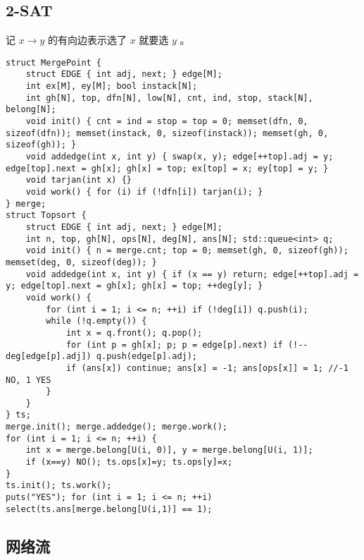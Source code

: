 \documentclass[landscape,a4paper]{article}
\begin{document}
\subsection{2-SAT}

记 $x \rightarrow y$ 的有向边表示选了 $x$ 就要选 $y$ 。

\begin{lstlisting}
struct MergePoint {
	struct EDGE { int adj, next; } edge[M];
	int ex[M], ey[M]; bool instack[N];
	int gh[N], top, dfn[N], low[N], cnt, ind, stop, stack[N], belong[N];
	void init() { cnt = ind = stop = top = 0; memset(dfn, 0, sizeof(dfn)); memset(instack, 0, sizeof(instack)); memset(gh, 0, sizeof(gh)); }
	void addedge(int x, int y) { swap(x, y); edge[++top].adj = y; edge[top].next = gh[x]; gh[x] = top; ex[top] = x; ey[top] = y; }
	void tarjan(int x) {}
	void work() { for (i) if (!dfn[i]) tarjan(i); }
} merge; 
struct Topsort {
	struct EDGE { int adj, next; } edge[M];
	int n, top, gh[N], ops[N], deg[N], ans[N]; std::queue<int> q;
	void init() { n = merge.cnt; top = 0; memset(gh, 0, sizeof(gh)); memset(deg, 0, sizeof(deg)); }
	void addedge(int x, int y) { if (x == y) return; edge[++top].adj = y; edge[top].next = gh[x]; gh[x] = top; ++deg[y]; }
	void work() {
		for (int i = 1; i <= n; ++i) if (!deg[i]) q.push(i);
		while (!q.empty()) {
			int x = q.front(); q.pop();
			for (int p = gh[x]; p; p = edge[p].next) if (!--deg[edge[p].adj]) q.push(edge[p].adj);
			if (ans[x]) continue; ans[x] = -1; ans[ops[x]] = 1; //-1 NO, 1 YES
		}
	}
} ts;
merge.init(); merge.addedge(); merge.work();
for (int i = 1; i <= n; ++i) {
	int x = merge.belong[U(i, 0)], y = merge.belong[U(i, 1)];
	if (x==y) NO(); ts.ops[x]=y; ts.ops[y]=x;
}
ts.init(); ts.work();
puts("YES"); for (int i = 1; i <= n; ++i) select(ts.ans[merge.belong[U(i,1)] == 1);
\end{lstlisting}

\subsection{网络流}
\end{document}
